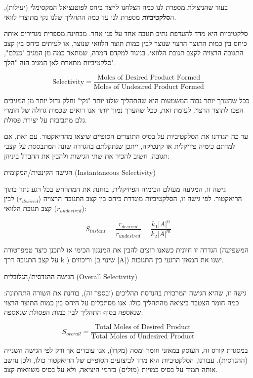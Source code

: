 \documentclass[
  hebrew,
  letterpaper,
  DIV=11,
  numbers=noendperiod]{scrreprt}
\begin{document}
בעוד שהניצולת מספרת לנו כמה הצלחנו לייצר ביחס לפוטנציאל המקסימלי
(יעילות), ה\textbf{סלקטיביות} מספרת לנו עד כמה התהליך שלנו
\textquotesingle נקי\textquotesingle{} מתוצרי לוואי.

סלקטיביות היא מדד להעדפת נתיב תגובה אחד על פני אחר. מבחינה מספרית
מגדירים אותה כיחס בין כמות התוצר הרצוי שנוצר לבין כמות תוצר הלוואי
שנוצר, או לעיתים כיחס בין קצב התגובה הרצויה לקצב תגובת הלוואי. בניגוד
למקדם המרה, שמתאר כמה מן המגיב "נעלם", סלקטיביות מתארת לאן המגיב הזה
"הלך".

\[\text{Selectivity} = \frac{\text{Moles of Desired Product Formed}}{\text{Moles of Undesired Product Formed}}\]

ככל שהערך יותר גבוה המשמעות היא שהתהליך שלנו יותר "נקי" וחלק גדול יותר
מן המגיבים הפכו לתוצר הרצוי. לעומת זאת, ככל שהערך נמוך יותר אנו רואים
שכמות גדולה של חומרי גלם \textquotesingle מתבזבזת\textquotesingle{} על
יצירת פסולת.

\begin{tcolorbox}[enhanced jigsaw, colback=white, arc=.35mm, coltitle=black, breakable, toptitle=1mm, leftrule=.75mm, colbacktitle=quarto-callout-tip-color!10!white, opacitybacktitle=0.6, bottomtitle=1mm, titlerule=0mm, opacityback=0, colframe=quarto-callout-tip-color-frame, title=\textcolor{quarto-callout-tip-color}{\faLightbulb}\hspace{0.5em}{עצה}, rightrule=.15mm, bottomrule=.15mm, toprule=.15mm, left=2mm]

עד כה הגדרנו את הסלקטיביות על בסיס התוצרים הסופיים שיצאו מהריאקטור. עם
זאת, אם למדתם כימיה פיזיקלית או קינטיקה, ייתכן שנתקלתם בהגדרה שונה
המתבססת על קצבי תגובה. חשוב להכיר את שתי הגישות ולהבין את ההבדל ביניהן:

הגישה הקינטית/המקומית (Instantaneous Selectivity)

גישה זו, המגיעה מעולם הכימיה הפיזיקלית, בוחנת את המתרחש בכל רגע נתון
בתוך הריאקטור. לפי גישה זו, הסלקטיביות מוגדרת כיחס בין קצב התגובה הרצויה
(\(r_{desired}\)) לבין קצב תגובת הלוואי (\(r_{undesired}\)):

\[S_{instant} = \frac{r_{desired}}{r_{undesired}} = \frac{k_{1}\lbrack A\rbrack^{n}}{k_{2}\lbrack A\rbrack^{m}}\]

הגדרה זו חיונית כשאנו רוצים להבין את המנגנון הכימי או לתכנן כיצד
טמפרטורה (המשפיעה על קצב התגובה דרך k ) וריכוזים (שינוי ב {[}A{]}) ישנו
את המאזן הרגעי בין התגובות.

הגישה ההנדסית/הגלובלית (Overall Selectivity)

גישה זו, שהיא הגישה המרכזית בהנדסת תהליכים (ובספר זה), בוחנת את השורה
התחתונה: כמה חומר הצטבר ביציאה מהתהליך כולו. אנו מסתכלים על היחס בין
כמות התוצר הרצוי שנאספה בסוף התהליך לבין כמות הפסולת שנאספה:

\[S_{overall} = \frac{\text{Total Moles of Desired Product}}{\text{Total Moles of Undesired Product}}\]

במסגרת קורס זה, העוסק במאזני חומר ומסה (מקרו), אנו עובדים אך ורק לפי
הגישה השנייה (ההנדסית). עבורנו, הסלקטיביות היא מדד לביצועים הסופיים של
הריאקטור כולו, ולכן נחשב אותה תמיד על בסיס כמויות (מולים) בזרמי היציאה,
ולא על בסיס משוואות קצב.

\end{tcolorbox}
\end{document}
